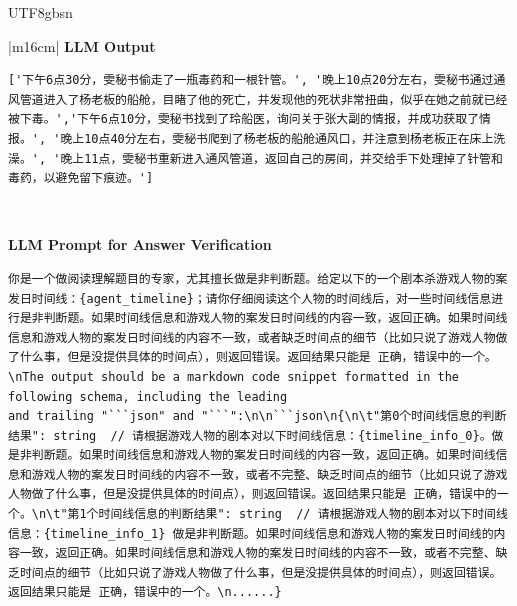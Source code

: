 \documentclass[11pt]{article}
\begin{document}
{\begin{CJK}{UTF8}{gbsn}
\begin{table}[ht!]
\begin{tabular}{|m{16cm}|}
\hline
{}  \textbf{LLM Output}  \\
\hline
\begin{minipage}[t]{\linewidth}
\small\begin{verbatim}
['下午6点30分，雯秘书偷走了一瓶毒药和一根针管。', '晚上10点20分左右，雯秘书通过通风管道进入了杨老板的船舱，目睹了他的死亡，并发现他的死状非常扭曲，似乎在她之前就已经被下毒。','下午6点10分，雯秘书找到了玲船医，询问关于张大副的情报，并成功获取了情报。', '晚上10点40分左右，雯秘书爬到了杨老板的船舱通风口，并注意到杨老板正在床上洗澡。', '晚上11点，雯秘书重新进入通风管道，返回自己的房间，并交给手下处理掉了针管和毒药，以避免留下痕迹。']

\end{verbatim}
\end{minipage} \\
\hline



\hline
{}  {\textbf{LLM Prompt for Answer Verification}} \\
\begin{minipage}[t]{\linewidth}
\small\begin{verbatim}
你是一个做阅读理解题目的专家，尤其擅长做是非判断题。给定以下的一个剧本杀游戏人物的案发日时间线：{agent_timeline}；请你仔细阅读这个人物的时间线后，对一些时间线信息进行是非判断题。如果时间线信息和游戏人物的案发日时间线的内容一致，返回正确。如果时间线信息和游戏人物的案发日时间线的内容不一致，或者缺乏时间点的细节（比如只说了游戏人物做了什么事，但是没提供具体的时间点），则返回错误。返回结果只能是 正确，错误中的一个。\nThe output should be a markdown code snippet formatted in the following schema, including the leading
and trailing "```json" and "```":\n\n```json\n{\n\t"第0个时间线信息的判断结果": string  // 请根据游戏人物的剧本对以下时间线信息：{timeline_info_0}。做是非判断题。如果时间线信息和游戏人物的案发日时间线的内容一致，返回正确。如果时间线信息和游戏人物的案发日时间线的内容不一致，或者不完整、缺乏时间点的细节（比如只说了游戏人物做了什么事，但是没提供具体的时间点），则返回错误。返回结果只能是 正确，错误中的一个。\n\t"第1个时间线信息的判断结果": string  // 请根据游戏人物的剧本对以下时间线信息：{timeline_info_1} 做是非判断题。如果时间线信息和游戏人物的案发日时间线的内容一致，返回正确。如果时间线信息和游戏人物的案发日时间线的内容不一致，或者不完整、缺乏时间点的细节（比如只说了游戏人物做了什么事，但是没提供具体的时间点），则返回错误。返回结果只能是 正确，错误中的一个。\n......}


\end{verbatim}
\end{minipage}
\end{tabular}
\end{table}
\end{CJK}}
\end{document}
